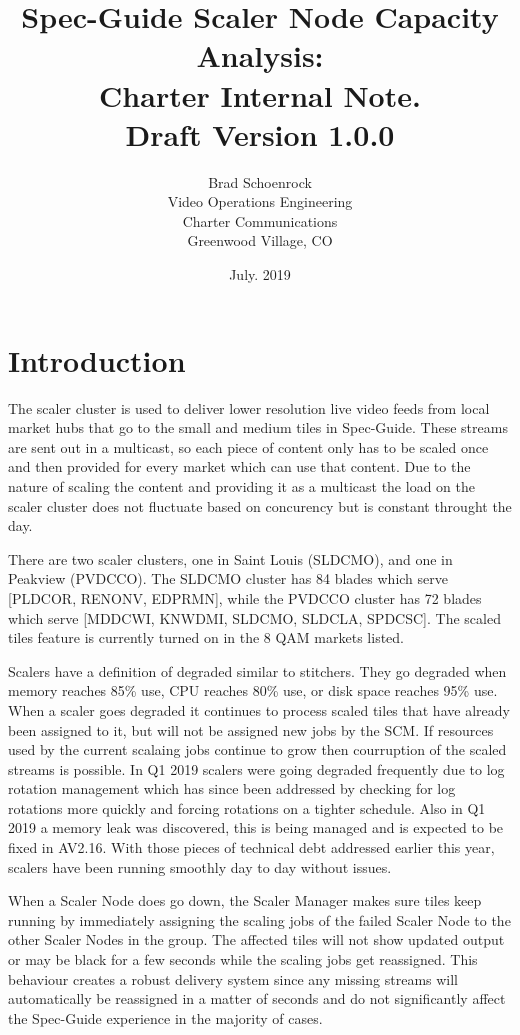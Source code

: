 \documentclass{article}
\author{Brad Schoenrock\\Video Operations Engineering\\Charter Communications\\Greenwood Village, CO}
\title{Spec-Guide Scaler Node Capacity Analysis:\\Charter Internal Note.\\Draft Version 1.0.0}
\date{July. 2019}
\begin{document}
\maketitle
\newpage

\tableofcontents
\newpage

\section{Introduction}
\label{SECTION-Introduction}

The scaler cluster is used to deliver lower resolution live video feeds from local market hubs that go to the small and medium tiles in Spec-Guide. These streams are sent out in a multicast, so each piece of content only has to be scaled once and then provided for every market which can use that content. Due to the nature of scaling the content and providing it as a multicast the load on the scaler cluster does not fluctuate based on concurency but is constant throught the day. 

There are two scaler clusters, one in Saint Louis (SLDCMO), and one in Peakview (PVDCCO). The SLDCMO cluster has 84 blades which serve [PLDCOR, RENONV, EDPRMN], while the PVDCCO cluster has 72 blades which serve [MDDCWI, KNWDMI, SLDCMO, SLDCLA, SPDCSC]. The scaled tiles feature is currently turned on in the 8 QAM markets listed. 

Scalers have a definition of degraded similar to stitchers. They go degraded when memory reaches 85\% use, CPU reaches 80\% use, or disk space reaches 95\% use. When a scaler goes degraded it continues to process scaled tiles that have already been assigned to it, but will not be assigned new jobs by the SCM. If resources used by the current scalaing jobs continue to grow then courruption of the scaled streams is possible. In Q1 2019 scalers were going degraded frequently due to log rotation management which has since been addressed by checking for log rotations more quickly and forcing rotations on a tighter schedule. Also in Q1 2019 a memory leak was discovered, this is being managed and is expected to be fixed in AV2.16. With those pieces of technical debt addressed earlier this year, scalers have been running smoothly day to day without issues. 

When a Scaler Node does go down, the Scaler Manager makes sure tiles keep running by immediately assigning the scaling jobs of the failed Scaler Node to the other Scaler Nodes in the group. The affected tiles will not show updated output or may be black for a few seconds while the scaling jobs get reassigned. This behaviour creates a robust delivery system since any missing streams will automatically be reassigned in a matter of seconds and do not significantly affect the Spec-Guide experience in the majority of cases. 
\end{document}
